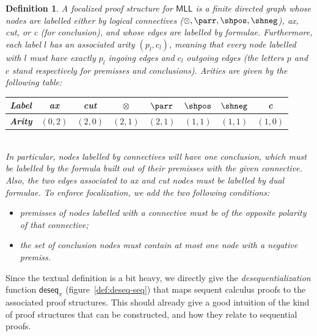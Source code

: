 \documentclass[12pt]{report}
\newtheorem{definition}{Definition}
\begin{document}
\begin{definition}
    A \emph{focalized proof structure} for $\mathsf{MLL}$ is a finite directed graph whose nodes
    are labelled either by logical connectives ($\otimes,\parr,\shpos,\shneg$), \emph{ax},
    \emph{cut}, or \emph{c} (for \emph{conclusion}), and whose edges are labelled by formulae.
    Furthermore, each label $l$ has an associated arity $(p_l, c_l)$, meaning that every node
    labelled with $l$ must have exactly $p_l$ ingoing edges and $c_l$ outgoing edges (the letters
    $p$ and $c$ stand respectively for \emph{premisses} and \emph{conclusions}). Arities are given
    by the following table: ~\\
    \begin{center}
    \begin{tabu}{|c|c|c|c|c|c|c|c|}
        \hline
        \rowfont{\normalfont} {\bf Label} & ax & cut & $\otimes$ & $\parr$ & $\shpos$ & $\shneg$ & c \\
        \hline
        {\normalfont\bf Arity} & $(0,2)$ & $(2,0)$ & $(2,1)$ & $(2,1)$ & $(1,1)$ & $(1,1)$ & $(1,0)$ \\
        \hline
    \end{tabu}
    \end{center}
    ~\\
    In particular, nodes labelled by connectives will have one conclusion, which must be labelled by
    the formula built out of their premisses with the given connective. Also, the two edges
    associated to \emph{ax} and \emph{cut} nodes must be labelled by dual formulae. To enforce
    focalization, we add the two following conditions:
    \begin{itemize}
        \item premisses of nodes labelled with a connective must be of the opposite polarity of that
        connective;
        \item the set of conclusion nodes must contain at most one node with a negative premiss.
    \end{itemize}
\end{definition}

Since the textual definition is a bit heavy, we directly give the \emph{desequentialization}
function $\mathsf{deseq}_π$ (figure~\ref{def:deseq-seq}) that maps sequent calculus proofs to the
associated proof structures. This should already give a good intuition of the kind of proof
structures that can be constructed, and how they relate to sequential proofs.
\end{document}
